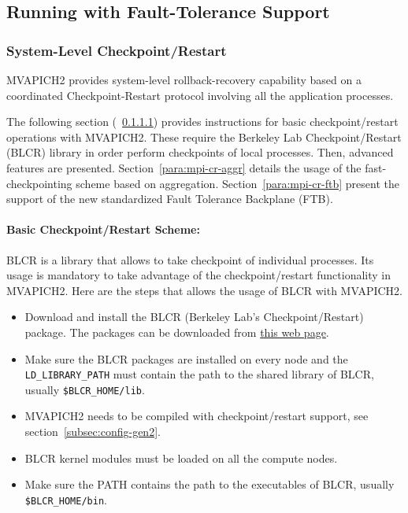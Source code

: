 \subsection{Running with Fault-Tolerance Support}
\label{subsec:mpi-ft}

\subsubsection{System-Level Checkpoint/Restart}
\label{subsubsec:mpi-cr}

MVAPICH2 provides system-level rollback-recovery capability based on a
coordinated Checkpoint-Restart protocol involving all the application processes.

The following section (~\ref{para:mpi-cr-basic}) provides instructions for basic
checkpoint/restart operations with MVAPICH2. These require the Berkeley Lab
Checkpoint/Restart (BLCR) library in order perform checkpoints of local
processes. Then, advanced features are presented.
Section~\ref{para:mpi-cr-aggr} details the usage of the fast-checkpointing
scheme based on aggregation.  Section~\ref{para:mpi-cr-ftb} present the support
of the new standardized Fault Tolerance Backplane (FTB).

\paragraph{Basic Checkpoint/Restart Scheme:}
\label{para:mpi-cr-basic}

BLCR is a library that allows to take checkpoint of individual processes.  Its
usage is mandatory to take advantage of the checkpoint/restart functionality in
MVAPICH2.  Here are the steps that allows the usage of BLCR with MVAPICH2.

\begin{itemize}
  \item Download and install the BLCR (Berkeley Lab's
    Checkpoint/Restart) package. The packages can be
    downloaded from
    \href{http://crd.lbl.gov/groups-depts/ftg/projects/current-projects/BLCR/berkeley-lab-checkpoint-restart-for-linux-blcr-downloads/}
    {this web page}.

  \item Make sure the BLCR packages are installed on every node
    and the \texttt{LD\_LIBRARY\_PATH} must contain the path
    to the shared library of BLCR, usually
    \texttt{\${BLCR\_HOME}/lib}.

  \item MVAPICH2 needs to be compiled with checkpoint/restart support, see
    section~\ref{subsec:config-gen2}.

  \item BLCR kernel modules must be loaded on all the compute nodes.

  \item Make sure the PATH contains the path to the executables of
    BLCR, usually \texttt{\${BLCR\_HOME}/bin}.
\end{itemize}

